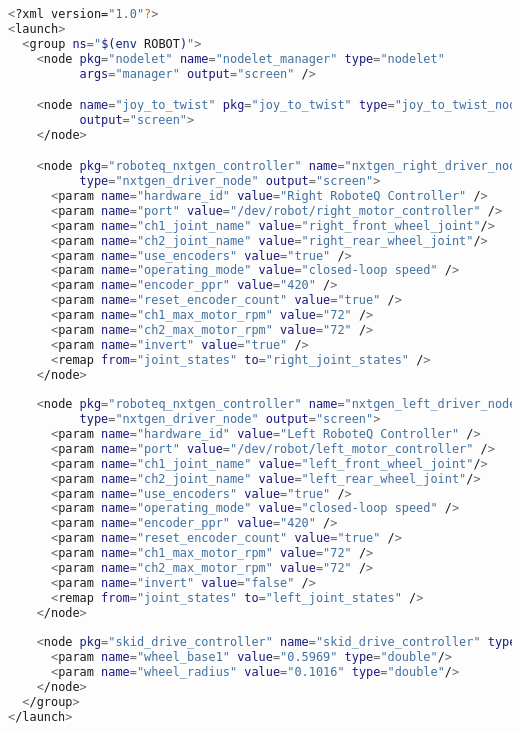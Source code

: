 \begin{lstlisting}[language=bash,caption=SMP Launch File, label=lst:launchfile,breaklines=true]
<?xml version="1.0"?>
<launch>
  <group ns="$(env ROBOT)">
    <node pkg="nodelet" name="nodelet_manager" type="nodelet"
          args="manager" output="screen" />

    <node name="joy_to_twist" pkg="joy_to_twist" type="joy_to_twist_node"
          output="screen">
    </node>

    <node pkg="roboteq_nxtgen_controller" name="nxtgen_right_driver_node"
          type="nxtgen_driver_node" output="screen">
      <param name="hardware_id" value="Right RoboteQ Controller" />
      <param name="port" value="/dev/robot/right_motor_controller" />
      <param name="ch1_joint_name" value="right_front_wheel_joint"/>
      <param name="ch2_joint_name" value="right_rear_wheel_joint"/>
      <param name="use_encoders" value="true" />
      <param name="operating_mode" value="closed-loop speed" />
      <param name="encoder_ppr" value="420" />
      <param name="reset_encoder_count" value="true" />
      <param name="ch1_max_motor_rpm" value="72" />
      <param name="ch2_max_motor_rpm" value="72" />
      <param name="invert" value="true" />
      <remap from="joint_states" to="right_joint_states" />
    </node>
 
    <node pkg="roboteq_nxtgen_controller" name="nxtgen_left_driver_node"
          type="nxtgen_driver_node" output="screen">
      <param name="hardware_id" value="Left RoboteQ Controller" />
      <param name="port" value="/dev/robot/left_motor_controller" />
      <param name="ch1_joint_name" value="left_front_wheel_joint"/>
      <param name="ch2_joint_name" value="left_rear_wheel_joint"/>
      <param name="use_encoders" value="true" />
      <param name="operating_mode" value="closed-loop speed" />
      <param name="encoder_ppr" value="420" />
      <param name="reset_encoder_count" value="true" />
      <param name="ch1_max_motor_rpm" value="72" />
      <param name="ch2_max_motor_rpm" value="72" />
      <param name="invert" value="false" />
      <remap from="joint_states" to="left_joint_states" />
    </node>
    
    <node pkg="skid_drive_controller" name="skid_drive_controller" type="base_controller_node" output="screen">
      <param name="wheel_base1" value="0.5969" type="double"/>
      <param name="wheel_radius" value="0.1016" type="double"/>
    </node>	
  </group>
</launch>
\end{lstlisting}

